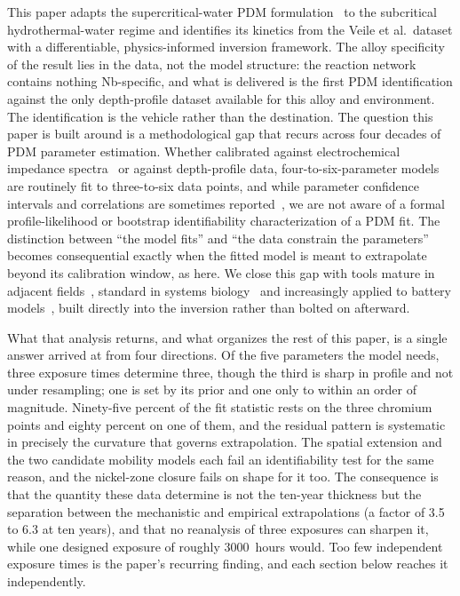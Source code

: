 \documentclass[pdflatex,sn-nature]{sn-jnl}
\begin{document}
This paper adapts the supercritical-water PDM
formulation~\citep{li2020scwpdm} to the subcritical hydrothermal-water
regime and identifies its kinetics from the Veile et al.\ dataset with a
differentiable, physics-informed inversion framework. The alloy
specificity of the result lies in the data, not the model structure:
the reaction network contains nothing Nb-specific, and what is delivered
is the first PDM identification against the only depth-profile dataset
available for this alloy and environment. The identification is the vehicle rather than the destination. The
question this paper is built around is a methodological gap that recurs
across four decades of PDM parameter estimation. Whether calibrated against electrochemical
impedance spectra~\citep{bojinov_mcm,ss316ln_pdm2024,ss321_pdm} or
against depth-profile data, four-to-six-parameter models are routinely
fit to three-to-six data points, and while parameter confidence
intervals and correlations are sometimes
reported~\citep{identifiability_electrochem1996}, we are not aware of a
formal profile-likelihood or bootstrap identifiability characterization
of a PDM fit. The distinction between ``the model fits'' and ``the data
constrain the parameters'' becomes consequential exactly when the fitted
model is meant to extrapolate beyond its calibration window, as here.
We close this gap with tools mature in adjacent
fields~\citep{raue2009identifiability,efron1979bootstrap,wieland2021identifiability},
standard in systems biology~\citep{biosystems_identifiability} and
increasingly applied to battery models~\citep{p2d_identifiability2021},
built directly into the inversion rather than bolted on afterward.

What that analysis returns, and what organizes the rest of this paper,
is a single answer arrived at from four directions. Of the five parameters the model needs, three exposure times determine three, though the third is sharp in profile and not under resampling; one is set by its prior and one only to within an order of magnitude.
Ninety-five percent of the fit statistic rests on the three chromium
points and eighty percent on one of them, and the residual pattern is
systematic in precisely the curvature that governs extrapolation. The spatial extension and the two candidate mobility models each fail an identifiability test for the same reason, and the nickel-zone closure fails on shape for it too.
The consequence is that the quantity these data determine is not the
ten-year thickness but the separation between the mechanistic and
empirical extrapolations (a factor of 3.5 to 6.3 at ten years), and that
no reanalysis of three exposures can sharpen it, while one designed
exposure of roughly 3000~hours would. Too few independent exposure times
is the paper's recurring finding, and each section below reaches it
independently.
\end{document}
